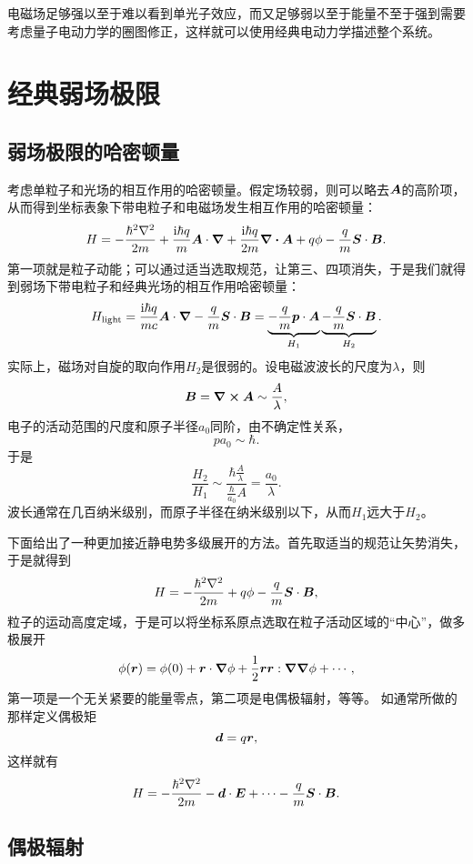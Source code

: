 \documentclass[UTF8, a4paper]{ctexart}
\newcommand*{\ii}{\mathrm{i}}
\begin{document}
电磁场足够强以至于难以看到单光子效应，而又足够弱以至于能量不至于强到需要考虑量子电动力学的圈图修正，这样就可以使用经典电动力学描述整个系统。

\section{经典弱场极限}

\subsection{弱场极限的哈密顿量}

考虑单粒子和光场的相互作用的哈密顿量。假定场较弱，则可以略去$\vb*{A}$的高阶项，从而得到坐标表象下带电粒子和电磁场发生相互作用的哈密顿量：
\[
    {H} = - \frac{\hbar^2 \laplacian}{2m} + \frac{\ii \hbar q}{m} \vb*{A} \cdot \grad + \frac{\ii \hbar q}{2 m} \div\vb*{A} + q \phi - \frac{q}{m} {\vb*{S}} \cdot \vb*{B}.
\]
第一项就是粒子动能；可以通过适当选取规范，让第三、四项消失，于是我们就得到弱场下带电粒子和经典光场的相互作用哈密顿量：
\begin{equation}
    {H}_\text{light} = \frac{\ii \hbar q}{m c} \vb*{A} \cdot \grad - \frac{q}{m} {\vb*{S}} \cdot \vb*{B} = \underbrace{- \frac{q}{m} {\vb*{p}} \cdot \vb*{A}}_{{H}_\text{1}} \underbrace{- \frac{q}{m} {\vb*{S}} \cdot \vb*{B}}_{{H}_2}.
\end{equation}
实际上，磁场对自旋的取向作用${H}_2$是很弱的。设电磁波波长的尺度为$\lambda$，则
\[
    \vb*{B} = \curl{\vb*{A}} \sim \frac{A}{\lambda},
\]
电子的活动范围的尺度和原子半径$a_0$同阶，由不确定性关系，
\[
    p a_0 \sim \hbar.
\]
于是
\[
    \frac{H_2}{H_1} \sim \frac{\hbar \frac{A}{\lambda}}{\frac{\hbar}{a_0} A} = \frac{a_0}{\lambda}.
\]
波长通常在几百纳米级别，而原子半径在纳米级别以下，从而${H}_1$远大于${H}_2$。

下面给出了一种更加接近静电势多级展开的方法。首先取适当的规范让矢势消失，于是就得到
\[
    {H} = - \frac{\hbar^2 \laplacian}{2m} + q \phi - \frac{q}{m} {\vb*{S}} \cdot \vb*{B},
\]
粒子的运动高度定域，于是可以将坐标系原点选取在粒子活动区域的“中心”，做多极展开
\[
    \phi(\vb*{r}) = \phi(0) + \vb*{r} \cdot \grad{\phi} + \frac{1}{2} \vb*{r} \vb*{r} : \grad{\grad{\phi}} + \cdots,
\]
第一项是一个无关紧要的能量零点，第二项是电偶极辐射，等等。
如通常所做的那样定义偶极矩
\begin{equation}
    {\vb*{d}} = q {\vb*{r}},
\end{equation}
这样就有
\begin{equation}
    {H} = - \frac{\hbar^2 \laplacian}{2m} - {\vb*{d}} \cdot \vb*{E} + \cdots - \frac{q}{m} {\vb*{S}} \cdot \vb*{B}.
\end{equation}

\subsection{偶极辐射}
\end{document}
